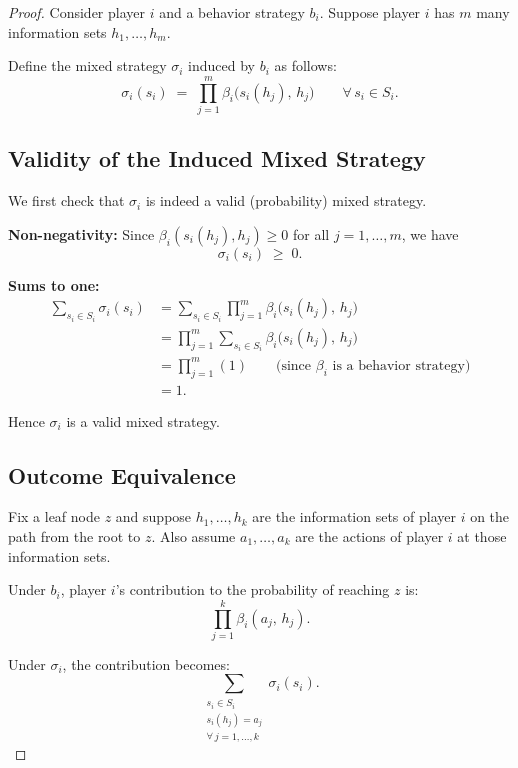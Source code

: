 \documentclass[12pt, a4paper]{article}
\begin{document}
\begin{proof}
Consider player $i$ and a behavior strategy $b_i$. Suppose player $i$ has $m$ many information sets $h_1, \ldots, h_m$.

Define the mixed strategy $\sigma_i$ induced by $b_i$ as follows:
\[
  \sigma_i(s_i) \;=\; \prod_{j=1}^{m} \beta_i\!\bigl(s_i(h_j),\, h_j\bigr)
  \qquad \forall\, s_i \in S_i.
\]

\subsection*{Validity of the Induced Mixed Strategy}

We first check that $\sigma_i$ is indeed a valid (probability) mixed strategy.

\medskip
\noindent\textbf{Non-negativity:} Since $\beta_i(s_i(h_j), h_j) \geq 0$ for all $j = 1, \ldots, m$, we have
\[
  \sigma_i(s_i) \;\geq\; 0.
\]

\noindent\textbf{Sums to one:}
\begin{align*}
  \sum_{s_i \in S_i} \sigma_i(s_i)
  &= \sum_{s_i \in S_i} \prod_{j=1}^{m} \beta_i\!\bigl(s_i(h_j),\, h_j\bigr) \\[4pt]
  &= \prod_{j=1}^{m} \sum_{s_i \in S_i} \beta_i\!\bigl(s_i(h_j),\, h_j\bigr) \\[4pt]
  &= \prod_{j=1}^{m} (1) \qquad \text{(since $\beta_i$ is a behavior strategy)} \\[4pt]
  &= 1.
\end{align*}

Hence $\sigma_i$ is a valid mixed strategy.

\subsection*{Outcome Equivalence}

Fix a leaf node $z$ and suppose $h_1, \ldots, h_k$ are the information sets of player $i$ on the path from the root to $z$. Also assume $a_1, \ldots, a_k$ are the actions of player $i$ at those information sets.

\medskip
\noindent Under $b_i$, player $i$'s contribution to the probability of reaching $z$ is:
\[
  \prod_{j=1}^{k} \beta_i(a_j,\, h_j).
\]

\noindent Under $\sigma_i$, the contribution becomes:
\[
  \sum_{\substack{s_i \in S_i \\ s_i(h_j) = a_j \\ \forall\, j = 1,\ldots,k}} \sigma_i(s_i).
\]


\end{proof}
\end{document}
